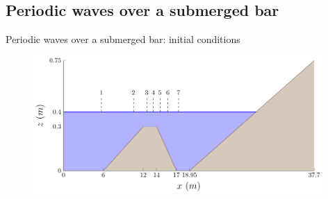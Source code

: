 \documentclass[pdf]{beamer}
\begin{document}
\subsection{Periodic waves over a submerged bar}
\begin{frame}{Periodic waves over a submerged bar: initial conditions}
		\begin{figure}
			\includegraphics[width=11cm]{./Pics/WT.pdf}
		\end{figure}
\end{frame}
\end{document}
